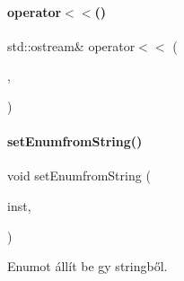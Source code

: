 \mbox{\label{_parts_8h_a511b4bb17c53709bf87fc0209ddbda19}} 
\paragraph{\texorpdfstring{operator$<$$<$()}{operator<<()}\hspace{0.1cm}{\footnotesize\ttfamily [40/40]}}
{\footnotesize\ttfamily std\+::ostream\& operator$<$$<$ (\begin{DoxyParamCaption}\item[{\mbox{\hyperlink{structtyp__ostream}{typ\+\_\+ostream}}}]{,  }\item[{const \mbox{\hyperlink{class_h_d_d}{H\+DD}} \&}]{ }\end{DoxyParamCaption})}

\mbox{\label{_parts_8h_a9927d3947b198137b12b944089e9a65c}} 
\paragraph{\texorpdfstring{setEnumfromString()}{setEnumfromString()}}
{\footnotesize\ttfamily void set\+Enumfrom\+String (\begin{DoxyParamCaption}\item[{\mbox{\hyperlink{class_string}{String}}}]{inst,  }\item[{\mbox{\hyperlink{_parts_8h_abddff37837f171d72a2e16a1448a3943}{enum\+Part}} \&}]{ }\end{DoxyParamCaption})}



Enumot állít be gy stringből. 

